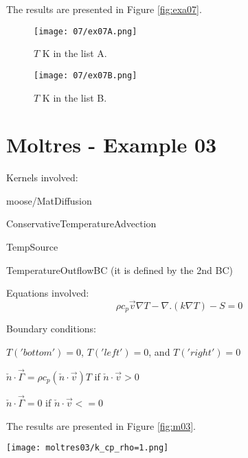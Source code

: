 \documentclass[11pt,letterpaper]{article}
\begin{document}
The results are presented in Figure \ref{fig:exa07}.
\begin{figure*}[!h]
	\centering
	\begin{subfigure}[t]{0.4\textwidth}
		\centering
		\texttt{[image: 07/ex07A.png]} 
		\caption{$T$ K in the list A.}
		\label{fig:exa07-temp1}
	\end{subfigure}
	\vspace{1cm}
	\begin{subfigure}[t]{0.4\textwidth}
		\centering
		\texttt{[image: 07/ex07B.png]} 
		\caption{$T$ K in the list B.}
		\label{fig:exa07-temp2}
	\end{subfigure}
	\hfill
	\caption{Temperature.}
	\label{fig:exa07}
\end{figure*}

\newpage
\section{Moltres - Example 03}

Kernels involved:
\begin{description}[font=$\bullet$\scshape\bfseries]
	\item[] moose/MatDiffusion
	\item[]	ConservativeTemperatureAdvection
	\item[] TempSource
	\item[] TemperatureOutflowBC (it is defined by the 2nd BC)
\end{description}

Equations involved:
\begin{equation}
\rho c_{p}\vec{v}\nabla T-\nabla.(k\nabla T)-S=0
\end{equation}

Boundary conditions:
\begin{description}[]
	\item[] $T('bottom')=0$, $T('left')=0$, and $T('right')=0$
	\item[] $\check{n}\cdot\vec{\Gamma}=\rho c_{p}(\check{n}\cdot\vec{v})T$ if $\check{n}\cdot\vec{v}>0$
	\item[] $\check{n}\cdot\vec{\Gamma}=0$ if $\check{n}\cdot\vec{v}<=0$
\end{description}

The results are presented in Figure \ref{fig:m03}.
\begin{figure*}[!h]
	\centering
	\texttt{[image: moltres03/k\_cp\_rho=1.png]} 
	\hfill
	\caption{Temperature.}
	\label{fig:m03}
\end{figure*}
\end{document}
